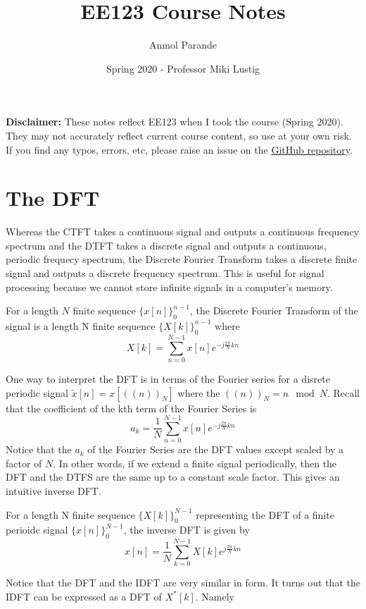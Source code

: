 

\title{EE123 Course Notes}
\author{Anmol Parande}
\date{Spring 2020 - Professor Miki Lustig}
\maketitle
\textbf{Disclaimer: }These notes reflect EE123 when I took the course (Spring 2020). They may not accurately reflect current course content, so use at your own risk.
If you find any typos, errors, etc, please raise an issue on the \href{https://github.com/parandea17/BerkeleyNotes}{GitHub repository}.
\tableofcontents
\newpage
\section{The DFT}
Whereas the CTFT takes a continuous signal and outputs a continuous frequency spectrum and the DTFT takes a discrete signal
and outputs a continuous, periodic frequecy spectrum, the Discrete Fourier Transform takes a discrete finite signal and outputs
a discrete frequency spectrum. This is useful for signal processing because we cannot store infinite signals in a computer's memory.
\begin{definition}
  For a length $N$ finite sequence $\{x[n]\}^{n-1}_{0}$, the Discrete Fourier Transform of the signal
  is a length N finite sequence $\{X[k]\}^{n-1}_{0}$ where
  \[
	X[k] = \sum_{n=0}^{N-1}{x[n]e^{-j\frac{2\pi}{N}kn}} 
  \]
  \label{defn:dft}
\end{definition}
One way to interpret the DFT is in terms of the Fourier series for a disrete periodic signal $\tilde{x}[n]=x[((n))_N]$ where the $((n))_N = n \mod N$.
Recall that the coefficient of the kth term of the Fourier Series is
\[
  a_k = \frac{1}{N}\sum_{n=0}^{N-1}{x[n]e^{-j\frac{2\pi}{N}kn}}
\]
Notice that the $a_k$ of the Fourier Series are the DFT values except scaled by a factor of $N$. In other words, if we extend a finite signal periodically, then the DFT and the DTFS are the same up to a constant scale factor.
This gives an intuitive inverse DFT.
\begin{definition}
  For a length N finite sequence $\{X[k]\}^{N-1}_{0}$ representing the DFT of a finite perioidc signal $\{x[n]\}^{N-1}_{0}$,
  the inverse DFT is given by
  \[
	x[n] = \frac{1}{N}\sum_{k=0}^{N-1}{X[k]e^{j\frac{2\pi}{N}kn}} 
  \]
  \label{defn:idft}
\end{definition}
Notice that the DFT and the IDFT are very similar in form. It turns out that the IDFT can be expressed as a DFT of $X^*[k]$. Namely
